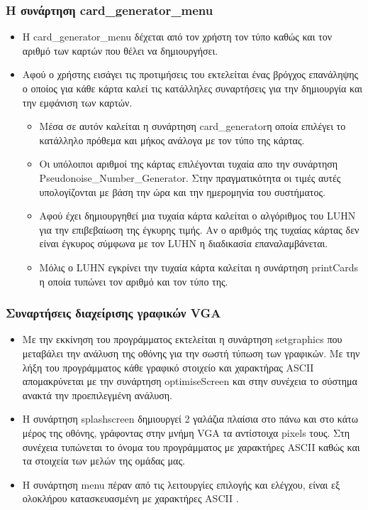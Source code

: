\documentclass[10pt,a4paper]{article}
\begin{document}
\subsubsection*{Η συνάρτηση \latintext card\_generator\_menu}
\begin{itemize}
\item Η \latintext card\_generator\_menu \greektext δέχεται από τον χρήστη τον τύπο  καθώς και τον αριθμό των καρτών που θέλει να δημιουργήσει.
\item Αφού ο χρήστης εισάγει τις προτιμήσεις του εκτελείται ένας βρόγχος επανάληψης ο οποίος για κάθε κάρτα καλεί τις κατάλληλες συναρτήσεις για την δημιουργία και την εμφάνιση των καρτών.
	\begin{itemize}
	\item Μέσα σε αυτόν καλείται η συνάρτηση \latintext card\_generator\greektext η οποία επιλέγει το κατάλληλο πρόθεμα και μήκος ανάλογα με τον τύπο της κάρτας.
	\item Οι υπόλοιποι αριθμοί της κάρτας επιλέγονται τυχαία απο την συνάρτηση \latintext Pseudonoise\_Number\_Generator\greektext. Στην πραγματικότητα οι τιμές αυτές υπολογίζονται με βάση την ώρα και την ημερομηνία του συστήματος.
	\item Αφού έχει δημιουργηθεί μια τυχαία κάρτα καλείται ο αλγόριθμος του \latintext LUHN \greektext για την επιβεβαίωση της έγκυρης τιμής. Αν ο αριθμός της τυχαίας κάρτας δεν είναι έγκυρος σύμφωνα με τον \latintext LUHN \greektext η διαδικασία επαναλαμβάνεται.
	\item Μόλις ο \latintext LUHN \greektext εγκρίνει την τυχαία κάρτα καλείται η συνάρτηση \latintext printCards \greektext η οποία τυπώνει τον αριθμό και τον τύπο της.
	\end{itemize}
\end{itemize}

\subsubsection*{Συναρτήσεις διαχείρισης γραφικών \latintext VGA }
\begin{itemize}
\item Με την εκκίνηση του προγράμματος εκτελείται η συνάρτηση \latintext setgraphics \greektext που μεταβάλει την ανάλυση της οθόνης για την σωστή τύπωση των γραφικών. Με την λήξη του προγράμματος κάθε γραφικό στοιχείο και χαρακτήρας \latintext ASCII \greektext απομακρύνεται με την συνάρτηση \latintext optimiseScreen \greektext και στην συνέχεια το σύστημα ανακτά την προεπιλεγμένη ανάλυση.
\item Η συνάρτηση \latintext splashscreen \greektext δημιουργεί 2 γαλάζια πλαίσια στο πάνω και στο κάτω μέρος της οθόνης, γράφοντας στην μνήμη \latintext VGA \greektext τα αντίστοιχα \latintext pixels \greektext τους. Στη συνέχεια τυπώνεται το όνομα του προγράμματος με χαρακτήρες \latintext ASCII \greektext καθώς και τα στοιχεία των μελών της ομάδας μας.
\item Η συνάρτηση \latintext menu \greektext πέραν από τις λειτουργίες επιλογής και ελέγχου, είναι εξ ολοκλήρου κατασκευασμένη με χαρακτήρες \latintext ASCII \greektext.
\end{itemize}
\end{document}
